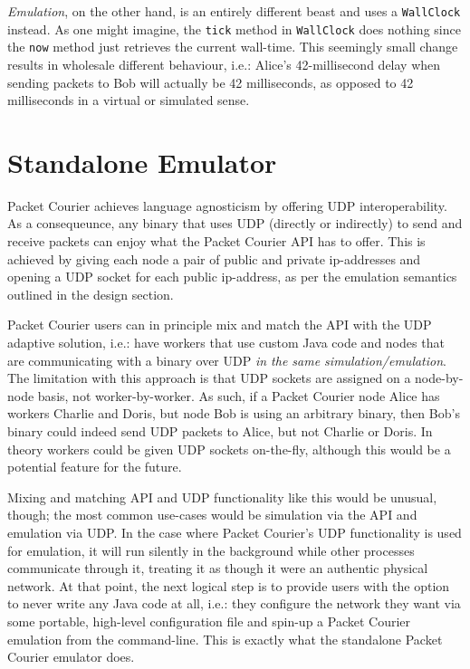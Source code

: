\emph{Emulation}, on the other hand, is an entirely different beast and uses a \texttt{WallClock} instead. As one
might imagine, the \texttt{tick} method in \texttt{WallClock} does nothing since the \texttt{now} method just
retrieves the current wall-time. This seemingly small change results in wholesale different behaviour, i.e.: Alice's
42-millisecond delay when sending packets to Bob will actually be 42 milliseconds, as opposed to 42 milliseconds in a
virtual or simulated sense.


\section{Standalone Emulator}\label{section:standalone_emulator}

Packet Courier achieves language agnosticism by offering UDP interoperability. As a consequeunce, any binary that
uses UDP (directly or indirectly) to send and receive packets can enjoy what the Packet Courier API has to offer.
This is achieved by giving each node a pair of public and private ip-addresses and opening a UDP socket for each
public ip-address, as per the emulation semantics outlined in the design section.

Packet Courier users can in principle mix and match the API with the UDP adaptive solution, i.e.: have workers that
use custom Java code and nodes that are communicating with a binary over UDP \emph{in the same simulation/emulation}.
The limitation with this approach is that UDP sockets are assigned on a node-by-node basis, not worker-by-worker. As
such, if a Packet Courier node Alice has workers Charlie and Doris, but node Bob is using an arbitrary binary, then
Bob's binary could indeed send UDP packets to Alice, but not Charlie or Doris. In theory workers could be given UDP
sockets on-the-fly, although this would be a potential feature for the future.

Mixing and matching API and UDP functionality like this would be unusual, though; the most common use-cases would be
simulation via the API and emulation via UDP. In the case where Packet Courier's UDP functionality is used for
emulation, it will run silently in the background while other processes communicate through it, treating it as though
it were an authentic physical network. At that point, the next logical step is to provide users with the option to
never write any Java code at all, i.e.: they configure the network they want via some portable, high-level
configuration file and spin-up a Packet Courier emulation from the command-line. This is exactly what the standalone
Packet Courier emulator does.

